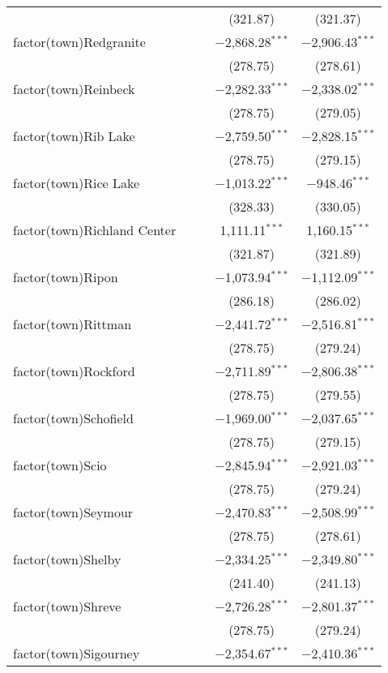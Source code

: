\begin{table}[!htbp]
\begin{tabular}{@{\extracolsep{5pt}}lcccc}
  &  &  & (321.87) & (321.37) \\ 
  factor(town)Redgranite &  &  & $-$2,868.28$^{***}$ & $-$2,906.43$^{***}$ \\ 
  &  &  & (278.75) & (278.61) \\ 
  factor(town)Reinbeck &  &  & $-$2,282.33$^{***}$ & $-$2,338.02$^{***}$ \\ 
  &  &  & (278.75) & (279.05) \\ 
  factor(town)Rib Lake &  &  & $-$2,759.50$^{***}$ & $-$2,828.15$^{***}$ \\ 
  &  &  & (278.75) & (279.15) \\ 
  factor(town)Rice Lake &  &  & $-$1,013.22$^{***}$ & $-$948.46$^{***}$ \\ 
  &  &  & (328.33) & (330.05) \\ 
  factor(town)Richland Center &  &  & 1,111.11$^{***}$ & 1,160.15$^{***}$ \\ 
  &  &  & (321.87) & (321.89) \\ 
  factor(town)Ripon &  &  & $-$1,073.94$^{***}$ & $-$1,112.09$^{***}$ \\ 
  &  &  & (286.18) & (286.02) \\ 
  factor(town)Rittman &  &  & $-$2,441.72$^{***}$ & $-$2,516.81$^{***}$ \\ 
  &  &  & (278.75) & (279.24) \\ 
  factor(town)Rockford &  &  & $-$2,711.89$^{***}$ & $-$2,806.38$^{***}$ \\ 
  &  &  & (278.75) & (279.55) \\ 
  factor(town)Schofield &  &  & $-$1,969.00$^{***}$ & $-$2,037.65$^{***}$ \\ 
  &  &  & (278.75) & (279.15) \\ 
  factor(town)Scio &  &  & $-$2,845.94$^{***}$ & $-$2,921.03$^{***}$ \\ 
  &  &  & (278.75) & (279.24) \\ 
  factor(town)Seymour &  &  & $-$2,470.83$^{***}$ & $-$2,508.99$^{***}$ \\ 
  &  &  & (278.75) & (278.61) \\ 
  factor(town)Shelby &  &  & $-$2,334.25$^{***}$ & $-$2,349.80$^{***}$ \\ 
  &  &  & (241.40) & (241.13) \\ 
  factor(town)Shreve &  &  & $-$2,726.28$^{***}$ & $-$2,801.37$^{***}$ \\ 
  &  &  & (278.75) & (279.24) \\ 
  factor(town)Sigourney &  &  & $-$2,354.67$^{***}$ & $-$2,410.36$^{***}$ \\ 

\end{tabular}
\end{table}
